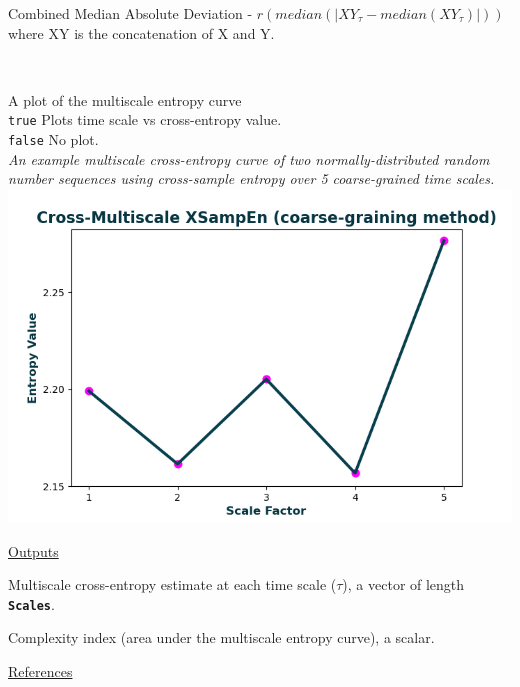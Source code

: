\documentclass[12pt, a4paper, titlepage, openany]{book}
\begin{document}
\begin{description}[labelsep=1cm, labelwidth=2cm, nosep, style=multiline,leftmargin=3cm]
\begin{description}[labelsep=5em, labelwidth=4em, nosep,style=multiline,leftmargin=2cm]
        \item[4]    Combined Median Absolute Deviation   - $r(median(|XY_{\tau} - median(XY_{\tau})|)) $  \\ where XY is the concatenation of X and Y.
	\end{description}
\ \\ 
\item[\texttt{Plotx}]		A plot of the multiscale entropy curve\\
							\texttt{true} \hspace{15pt} Plots time scale vs cross-entropy value.\\
							\texttt{false}\hspace{12pt} No plot.\\ 	
						\textit{An example multiscale cross-entropy curve of two normally-distributed random number sequences using cross-sample entropy over 5 coarse-grained time scales.}\\
							\includegraphics[scale=.7]{XMSEn1.png}
\end{description}

\noindent \ul{Outputs}
\begin{description}[labelsep=1cm, labelwidth=2cm, nosep, style=multiline,leftmargin=3cm]\footnotesize
\item[\texttt{MSx}]		Multiscale cross-entropy estimate at each time scale ($\tau$), a vector of length 											\textbf{\texttt{Scales}}.
\item[\texttt{Ci}]		Complexity index (area under the multiscale entropy curve), a scalar.
\end{description}

\noindent \ul{References}\hspace{1cm}
\cite{MS1} \cite{MS2} \cite{MS3} \cite{XMS1} \cite{XMS2} \cite{XMS3} \cite{XMS4} 
\end{document}
